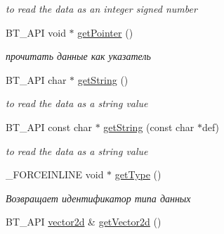 \begin{DoxyCompactItemize}
\begin{DoxyCompactList}\small\item\em to read the data as an integer signed number \end{DoxyCompactList}\item 
\hypertarget{classbt_1_1_variant_ad45542d4c0a0372369fd2a6d9d2a05af}{B\-T\-\_\-\-A\-P\-I void $\ast$ \hyperlink{classbt_1_1_variant_ad45542d4c0a0372369fd2a6d9d2a05af}{get\-Pointer} ()}\label{classbt_1_1_variant_ad45542d4c0a0372369fd2a6d9d2a05af}

\begin{DoxyCompactList}\small\item\em прочитать данные как указатель \end{DoxyCompactList}\item 
\hypertarget{classbt_1_1_variant_a8793dad141a4c210e7aefbb3dcc9f46d}{B\-T\-\_\-\-A\-P\-I char $\ast$ \hyperlink{classbt_1_1_variant_a8793dad141a4c210e7aefbb3dcc9f46d}{get\-String} ()}\label{classbt_1_1_variant_a8793dad141a4c210e7aefbb3dcc9f46d}

\begin{DoxyCompactList}\small\item\em to read the data as a string value \end{DoxyCompactList}\item 
\hypertarget{classbt_1_1_variant_a28e6f2ac5fd4f647f28bb0a27707a4b7}{B\-T\-\_\-\-A\-P\-I const char $\ast$ \hyperlink{classbt_1_1_variant_a28e6f2ac5fd4f647f28bb0a27707a4b7}{get\-String} (const char $\ast$def)}\label{classbt_1_1_variant_a28e6f2ac5fd4f647f28bb0a27707a4b7}

\begin{DoxyCompactList}\small\item\em to read the data as a string value \end{DoxyCompactList}\item 
\hypertarget{classbt_1_1_variant_a6da9c5fd40f112987366b26658601391}{\-\_\-\-F\-O\-R\-C\-E\-I\-N\-L\-I\-N\-E void $\ast$ \hyperlink{classbt_1_1_variant_a6da9c5fd40f112987366b26658601391}{get\-Type} ()}\label{classbt_1_1_variant_a6da9c5fd40f112987366b26658601391}

\begin{DoxyCompactList}\small\item\em Возвращает идентификатор типа данных \end{DoxyCompactList}\item 
\hypertarget{classbt_1_1_variant_aa8ce5730fa315753f80175ae6f9c2faf}{B\-T\-\_\-\-A\-P\-I \hyperlink{classbt_1_1vector2d}{vector2d} \& \hyperlink{classbt_1_1_variant_aa8ce5730fa315753f80175ae6f9c2faf}{get\-Vector2d} ()}\label{classbt_1_1_variant_aa8ce5730fa315753f80175ae6f9c2faf}


\end{DoxyCompactItemize}
